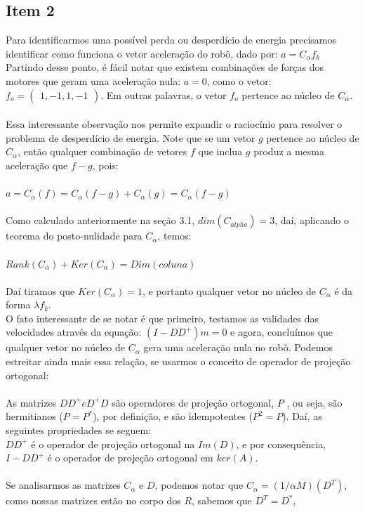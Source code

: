 \documentclass{article}
\begin{document}
\subsection{Item 2}
Para identificarmos uma possível perda ou desperdício de energia precisamos identificar como funciona o vetor aceleração do robô, dado por: 
$ a = C_{\alpha}f_{k}$ Partindo desse ponto, é fácil notar que existem combinações de forças dos motores que geram uma aceleração nula:
$ a = 0 $, como o vetor: $f_{o} = \begin{pmatrix} 1,-1,1,-1\end{pmatrix}$. Em outras palavras, o vetor $f_{o}$ pertence ao núcleo de $C_{\alpha}$.
\\ \\
Essa interessante observação nos permite expandir o raciocínio para resolver o problema de desperdício de energia. Note que se um vetor $g$ pertence ao núcleo de $C_{\alpha}$, então qualquer combinação de vetores $f$ que inclua $g$
produz a mesma aceleração que $f - g$, pois:\\
\\  $ a = C_{\alpha}(f) = C_{\alpha}(f-g) + C_{\alpha}(g) = C_{\alpha}(f-g)$
\\ \\
Como calculado anteriormente na seção 3.1, $dim(C_{alpha}) = 3$, daí, aplicando o teorema do posto-nulidade para $C_{\alpha}$, temos:
\\  \\ $ Rank(C_{\alpha}) + Ker(C_{\alpha}) = Dim(coluna)$ \\ \\
Daí tiramos que $Ker(C_{\alpha}) = 1 $, e portanto qualquer vetor no núcleo de $C_{\alpha}$ é da forma $\lambda f_{k}$.
\\ O fato interessante de se notar é que primeiro, testamos as validades das velocidades através da equação: $(I-DD^+)m = 0$
e agora, concluímos que qualquer vetor no núcleo de $C_{\alpha}$ gera uma aceleração nula no robô. Podemos estreitar ainda mais essa relação,
se usarmos o conceito de operador de projeção ortogonal:
\\ \\ As matrizes $DD^+ e D^+D$ são operadores de projeção ortogonal, $P$ , ou seja, são hermitianos ($P = P^*$), por definição, e são idempotentes
($P^2 = P$). Daí, as seguintes propriedades se seguem:
\\ $DD^+$ é o operador de projeção ortogonal na $Im(D)$, e por consequência, $I - DD^+$ é o operador de projeção ortogonal em $ker(A)$.
\\ \\ Se analisarmos as matrizes $C_{\alpha}$ e $D$, podemos notar que $C_{\alpha} = (1/{\alpha}M)(D^T)$, como nossas matrizes estão no corpo dos $R$, sabemos que $D^T = D^*$,
\end{document}
